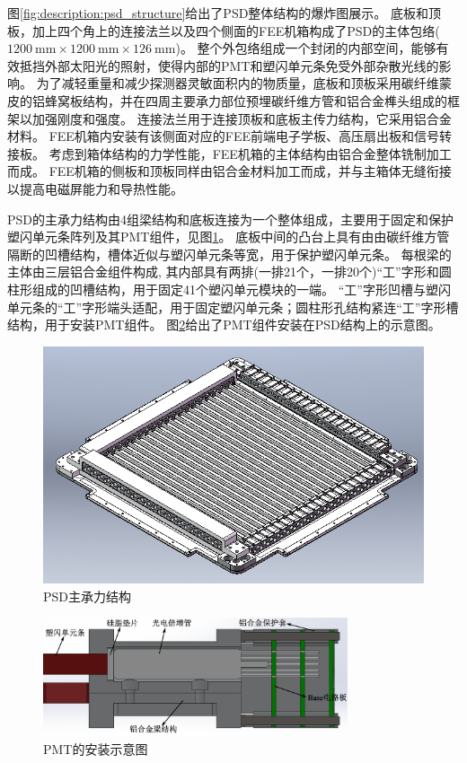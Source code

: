 图\ref*{fig:description:psd_structure}给出了PSD整体结构的爆炸图展示。
底板和顶板，加上四个角上的连接法兰以及四个侧面的FEE机箱构成了PSD的主体包络($\SI{1200}{\milli\meter}\times\SI{1200}{\milli\meter}\times\SI{126}{\milli\meter}$)。
整个外包络组成一个封闭的内部空间，能够有效抵挡外部太阳光的照射，使得内部的PMT和塑闪单元条免受外部杂散光线的影响。
为了减轻重量和减少探测器灵敏面积内的物质量，底板和顶板采用碳纤维蒙皮的铝蜂窝板结构，并在四周主要承力部位预埋碳纤维方管和铝合金榫头组成的框架以加强刚度和强度。
连接法兰用于连接顶板和底板主传力结构，它采用铝合金材料。
FEE机箱内安装有该侧面对应的FEE前端电子学板、高压扇出板和信号转接板。
考虑到箱体结构的力学性能，FEE机箱的主体结构由铝合金整体铣制加工而成。
FEE机箱的侧板和顶板同样由铝合金材料加工而成，并与主箱体无缝衔接以提高电磁屏能力和导热性能。

PSD的主承力结构由4组梁结构和底板连接为一个整体组成，主要用于固定和保护塑闪单元条阵列及其PMT组件，见图\ref{fig:description:bottom_plate}。
底板中间的凸台上具有由由碳纤维方管隔断的凹槽结构，槽体近似与塑闪单元条等宽，用于保护塑闪单元条。
每根梁的主体由三层铝合金组件构成, 其内部具有两排(一排21个，一排20个)“工”字形和圆柱形组成的凹槽结构，用于固定41个塑闪单元模块的一端。
“工”字形凹槽与塑闪单元条的“工”字形端头适配，用于固定塑闪单元条；圆柱形孔结构紧连“工”字形槽结构，用于安装PMT组件。
图\ref{fig:description:pmt_protection}给出了PMT组件安装在PSD结构上的示意图。
\begin{figure}[h!]
\centering
\includegraphics[width=0.7\linewidth]{chap/description/fig/bottom_plate}
\caption{PSD主承力结构}
\label{fig:description:bottom_plate}
\end{figure}

\begin{figure}[htbp]
	\centering
	\includegraphics[width=0.8\textwidth]{chap/description/fig/pmt_protection.eps}
	\caption{PMT的安装示意图}
	\label{fig:description:pmt_protection}
\end{figure}

